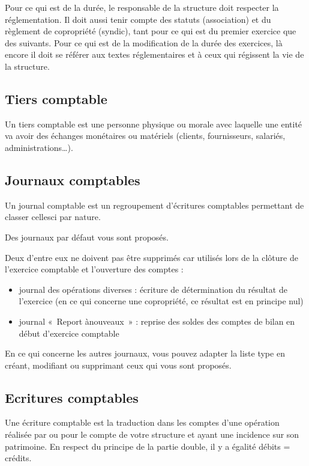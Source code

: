 \documentclass[a4paper,10pt,oneside,french]{sphinxmanual}
\begin{document}
Pour ce qui est de la durée, le responsable de la structure doit respecter la réglementation. Il doit aussi tenir compte des statuts (association) et du règlement de copropriété (syndic), tant pour ce qui est du premier exercice que des suivants. Pour ce qui est de la modification de la durée des exercices, là encore il doit se référer aux textes réglementaires et à ceux qui régissent la vie de la structure.


\subsection{Tiers comptable}
\label{\detokenize{accounting/definition:tiers-comptable}}
Un tiers comptable est une personne physique ou morale avec laquelle une entité va avoir des échanges monétaires ou matériels (clients, fournisseurs, salariés, administrations…).


\subsection{Journaux comptables}
\label{\detokenize{accounting/definition:journaux-comptables}}
Un journal comptable est un regroupement d’écritures comptables permettant de classer celles\sphinxhyphen{}ci par nature.

Des journaux par défaut vous sont proposés.

Deux d’entre eux ne doivent pas être supprimés car utilisés lors de la clôture de l’exercice comptable et l’ouverture des comptes :
\begin{itemize}
\item {} 
journal des opérations diverses : écriture de détermination du résultat de l’exercice (en ce qui concerne une copropriété, ce résultat est en principe nul)

\item {} 
journal « Report à\sphinxhyphen{}nouveaux » : reprise des soldes des comptes de bilan en début d’exercice comptable

\end{itemize}

En ce qui concerne les autres journaux, vous pouvez adapter la liste type en créant, modifiant ou supprimant ceux qui vous sont proposés.


\subsection{Ecritures comptables}
\label{\detokenize{accounting/definition:ecritures-comptables}}
Une écriture comptable est la traduction dans les comptes d’une opération réalisée par ou pour le compte de votre structure et ayant une incidence sur son patrimoine. En respect du principe de la partie double, il y a égalité débits = crédits.
\end{document}
